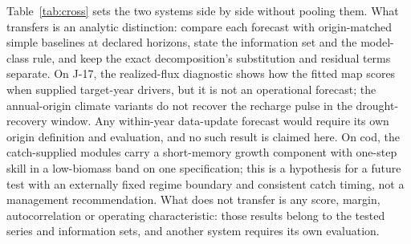 Table~\ref{tab:cross} sets the two systems side by side without pooling them. What transfers is an analytic distinction: compare each forecast with origin-matched simple baselines at declared horizons, state the information set and the model-class rule, and keep the exact decomposition's substitution and residual terms separate. On J-17, the realized-flux diagnostic shows how the fitted map scores when supplied target-year drivers, but it is not an operational forecast; the annual-origin climate variants do not recover the recharge pulse in the drought-recovery window. Any within-year data-update forecast would require its own origin definition and evaluation, and no such result is claimed here. On cod, the catch-supplied modules carry a short-memory growth component with one-step skill in a low-biomass band on one specification; this is a hypothesis for a future test with an externally fixed regime boundary and consistent catch timing, not a management recommendation. What does not transfer is any score, margin, autocorrelation or operating characteristic: those results belong to the tested series and information sets, and another system requires its own evaluation.

